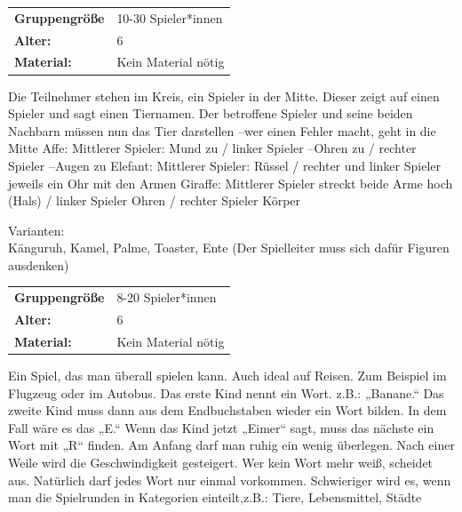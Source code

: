 \begin{table}[H]
\begin{tabular}{>{\bfseries}lp{8cm}}
   Gruppengröße   & 10-30 Spieler*innen\\
    Alter: & 6 \\
    Material: & Kein Material nötig \\
\end{tabular}
\end{table} 
Die Teilnehmer stehen im Kreis, ein Spieler in der Mitte. Dieser zeigt auf einen Spieler und sagt einen Tiernamen. Der betroffene Spieler und seine beiden Nachbarn müssen nun das Tier darstellen –wer einen Fehler macht, geht in die Mitte Affe: Mittlerer Spieler: Mund zu / linker Spieler –Ohren zu / rechter Spieler –Augen zu Elefant: Mittlerer Spieler: Rüssel / rechter und linker Spieler jeweils ein Ohr mit den Armen Giraffe: Mittlerer Spieler streckt beide Arme hoch (Hals) / linker Spieler Ohren / rechter Spieler Körper\\ \newline

    Varianten: \\ Känguruh, Kamel, Palme, Toaster, Ente (Der Spielleiter muss sich dafür Figuren ausdenken)\\



\begin{table}[H]
\begin{tabular}{>{\bfseries}lp{8cm}}
   Gruppengröße   & 8-20 Spieler*innen\\
    Alter: & 6 \\
    Material: & Kein Material nötig\\ 
\end{tabular}
\end{table} 
Ein Spiel, das man überall spielen kann. Auch ideal auf Reisen. Zum Beispiel im Flugzeug oder im Autobus. Das erste Kind nennt ein Wort. z.B.: „Banane.“ Das zweite Kind muss dann aus dem Endbuchstaben wieder ein Wort bilden. In dem Fall wäre es das „E.“ Wenn das Kind jetzt „Eimer“ sagt, muss das nächste ein Wort mit „R“ finden. Am Anfang darf man ruhig ein wenig überlegen. Nach einer Weile wird die Geschwindigkeit gesteigert. Wer kein Wort mehr weiß, scheidet aus. Natürlich darf jedes Wort nur einmal vorkommen. Schwieriger wird es, wenn man die Spielrunden in Kategorien einteilt,z.B.: Tiere, Lebensmittel, Städte \\



